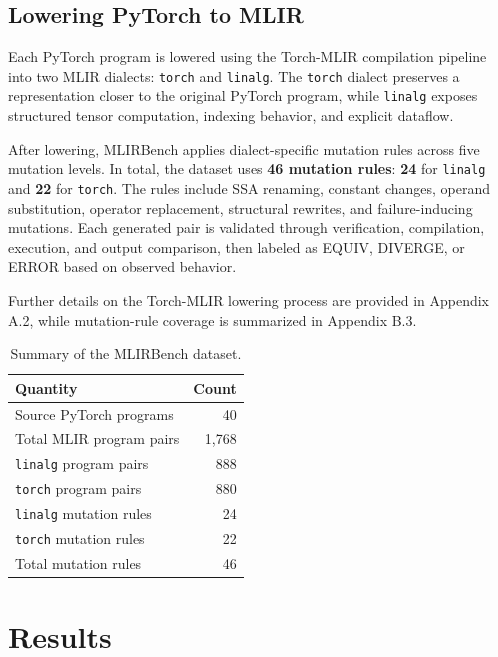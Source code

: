 \documentclass[sigplan,screen,review,anonymous]{acmart}
\begin{document}
\subsection{Lowering PyTorch to MLIR}

Each PyTorch program is lowered using the Torch-MLIR compilation pipeline into two MLIR dialects: \texttt{torch} and \texttt{linalg}. The \texttt{torch} dialect preserves a representation closer to the original PyTorch program, while \texttt{linalg} exposes structured tensor computation, indexing behavior, and explicit dataflow.

After lowering, MLIRBench applies dialect-specific mutation rules across five mutation levels. In total, the dataset uses \textbf{46 mutation rules}: \textbf{24} for \texttt{linalg} and \textbf{22} for \texttt{torch}. The rules include SSA renaming, constant changes, operand substitution, operator replacement, structural rewrites, and failure-inducing mutations. Each generated pair is validated through verification, compilation, execution, and output comparison, then labeled as \textsc{EQUIV}, \textsc{DIVERGE}, or \textsc{ERROR} based on observed behavior.

Further details on the Torch-MLIR lowering process are provided in Appendix A.2, while mutation-rule coverage is summarized in Appendix B.3.

\begin{table}[t]
    \centering
    \caption{Summary of the MLIRBench dataset.}
    \label{tab:dataset_summary}
    \begin{tabular}{lr}
        \toprule
        Quantity & Count \\
        \midrule
        Source PyTorch programs & 40 \\
        Total MLIR program pairs & 1,768 \\
        \texttt{linalg} program pairs & 888 \\
        \texttt{torch} program pairs & 880 \\
        \texttt{linalg} mutation rules & 24 \\
        \texttt{torch} mutation rules & 22 \\
        Total mutation rules & 46 \\
        \bottomrule
    \end{tabular}
\end{table}


\section{Results}
\end{document}
